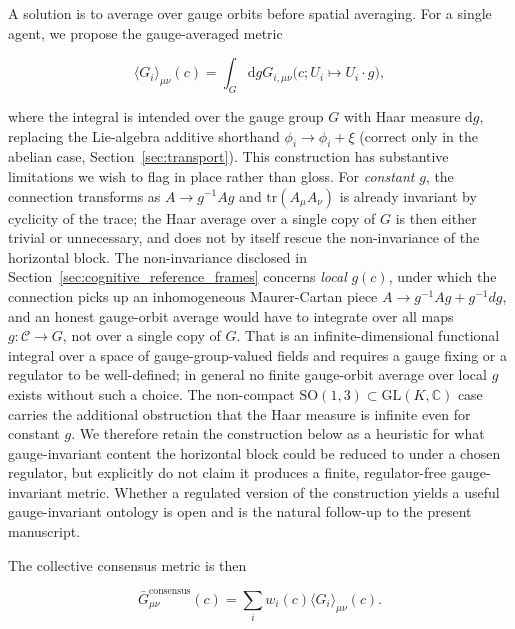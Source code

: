 \documentclass[11pt]{article}
\begin{document}
A solution is to average over gauge orbits before spatial averaging. For a single agent, we propose the gauge-averaged metric

\begin{equation}
\langle G_i \rangle_{\mu\nu}(c) = \int_G \mathrm{d}g  G_{i,\mu\nu}\big(c; U_i \mapsto U_i \cdot g\big),
\end{equation}

where the integral is intended over the gauge group $G$ with Haar measure $\mathrm{d}g$, replacing the Lie-algebra additive shorthand $\phi_i \to \phi_i + \xi$ (correct only in the abelian case, Section~\ref{sec:transport}). This construction has substantive limitations we wish to flag in place rather than gloss. For \emph{constant} $g$, the connection transforms as $A \to g^{-1}Ag$ and $\mathrm{tr}(A_\mu A_\nu)$ is already invariant by cyclicity of the trace; the Haar average over a single copy of $G$ is then either trivial or unnecessary, and does not by itself rescue the non-invariance of the horizontal block. The non-invariance disclosed in Section~\ref{sec:cognitive_reference_frames} concerns \emph{local} $g(c)$, under which the connection picks up an inhomogeneous Maurer-Cartan piece $A \to g^{-1}Ag + g^{-1}dg$, and an honest gauge-orbit average would have to integrate over all maps $g: \mathcal{C} \to G$, not over a single copy of $G$. That is an infinite-dimensional functional integral over a space of gauge-group-valued fields and requires a gauge fixing or a regulator to be well-defined; in general no finite gauge-orbit average over local $g$ exists without such a choice. The non-compact $\mathrm{SO}(1,3) \subset \mathrm{GL}(K, \mathbb{C})$ case carries the additional obstruction that the Haar measure is infinite even for constant $g$. We therefore retain the construction below as a heuristic for what gauge-invariant content the horizontal block could be reduced to under a chosen regulator, but explicitly do not claim it produces a finite, regulator-free gauge-invariant metric. Whether a regulated version of the construction yields a useful gauge-invariant ontology is open and is the natural follow-up to the present manuscript.

The collective consensus metric is then

\begin{equation}
\bar{G}_{\mu\nu}^{\text{consensus}}(c) = \sum_i w_i(c) \langle G_i \rangle_{\mu\nu}(c).
\label{eq:consensus_metric}
\end{equation}
\end{document}
